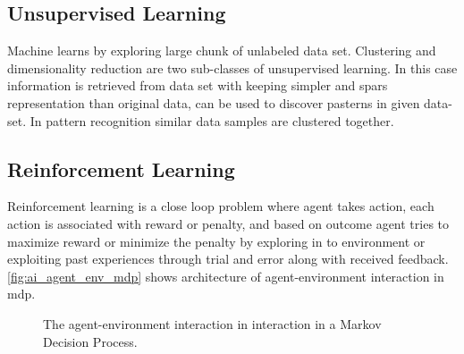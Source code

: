 \subsection{Unsupervised Learning}
Machine learns by exploring large chunk of unlabeled data set. Clustering and dimensionality reduction are two sub-classes of unsupervised learning. In this case information is retrieved from data set with keeping simpler and spars representation than original data, can be used to discover pasterns in given data-set. In pattern recognition similar data samples are clustered together.

\subsection{Reinforcement Learning}
Reinforcement learning is a close loop problem where agent takes action, each action is associated with reward or penalty, and based on outcome agent tries to maximize reward or minimize the penalty by exploring in to environment or exploiting past experiences through trial and error along with received feedback. \autoref{fig:ai_agent_env_mdp} shows architecture of agent-environment interaction in \acrlong{mdp}.\cite{russell2010artificial}

\begin{figure}[H]
    \centering


    \caption{The agent-environment interaction in  interaction in a Markov Decision Process. \cite{sutton2018reinforcement}}
    \label{fig:ai_agent_env_mdp}
\end{figure}

